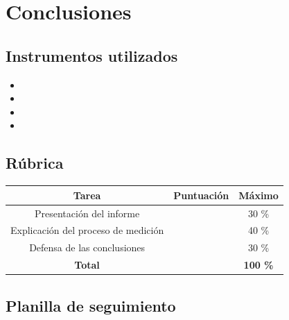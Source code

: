 \chapter{Conclusiones}

\section{Instrumentos utilizados}
\begin{itemize}
  \item
  \item
  \item  
  \item
\end{itemize}

\section{Rúbrica}

\begin{table}[H]
  \centering
  \begin{tabular}{|c|c|c|}
    \hline
    \rowcolor[gray]{0.8}
    \textbf{Tarea} & \textbf{Puntuación} & \textbf{Máximo} \\
    \hline
    Presentación del informe & & 30 \% \\
    \hline
    Explicación del proceso de medición & & 40 \% \\
    \hline
    Defensa de las conclusiones & & 30 \% \\
    \hline
    \textbf{Total} & & \textbf{100 \%} \\
    \hline
  \end{tabular}
\end{table}

\section{Planilla de seguimiento}

